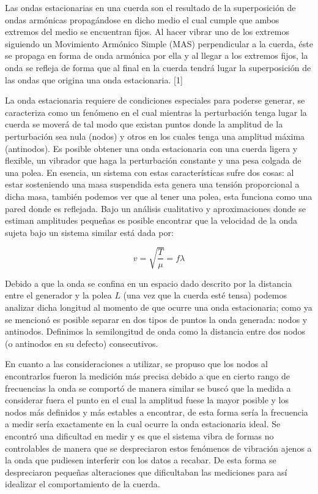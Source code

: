 \documentclass[10pt,a4paper]{article}
\begin{document}
Las ondas estacionarias en una cuerda son el resultado de la superposición de ondas armónicas propagándose en dicho medio el cual cumple que ambos extremos del medio se encuentran fijos. Al hacer vibrar uno de los extremos siguiendo un Movimiento Armónico Simple (MAS) perpendicular a la cuerda, éste se propaga en forma de onda armónica por ella y al llegar a los extremos fijos, la onda se refleja de forma que al final en la cuerda tendrá lugar la superposición de las ondas que origina una onda estacionaria. [1] 

La onda estacionaria requiere de condiciones especiales para poderse generar, se caracteriza como un fenómeno en el cual mientras la perturbación tenga lugar la cuerda se moverá de tal modo que existan puntos donde la amplitud de la perturbación sea nula (nodos) y otros en los cuales tenga una amplitud máxima (antinodos). Es posible obtener una onda estacionaria con una cuerda ligera y flexible, un vibrador que haga la perturbación constante y una pesa colgada de una polea. En esencia, un sistema con estas características sufre dos cosas: al estar sosteniendo una masa suspendida esta genera una tensión proporcional a dicha masa, también podemos ver que al tener una polea, esta funciona como una pared donde es reflejada. Bajo un análisis cualitativo y aproximaciones donde se estiman amplitudes pequeñas es posible encontrar que la velocidad de la onda sujeta bajo un sistema similar está dada por:

\begin{equation}
v=\sqrt{\frac{T}{\mu}}= f \lambda
\end{equation}

Debido a que la onda se confina en un espacio dado descrito por la distancia entre el generador y la polea $L$ (una vez que la cuerda esté tensa) podemos analizar dicha longitud al momento de que ocurre una onda estacionaria; como ya se mencionó es posible separar en dos tipos de puntos la onda generada: nodos y antinodos. Definimos la semilongitud de onda como la distancia entre dos nodos (o antinodos en su defecto) consecutivos.

En cuanto a las consideraciones a utilizar, se propuso que los nodos al encontrarlos fueron la medición más precisa debido a que en cierto rango de frecuencias la onda se comportó de manera similar se buscó que la medida a considerar fuera el punto en el cual la amplitud fuese la mayor posible y los nodos más definidos y más estables a encontrar, de esta forma sería la frecuencia a medir sería exactamente en la cual ocurre la onda estacionaria ideal. Se encontró una dificultad en medir y es que el sistema vibra de formas no controlables de manera que se despreciaron estos fenómenos de vibración ajenos a la onda que pudiesen interferir con los datos a recabar. De esta forma se despreciaron pequeñas alteraciones que dificultaban las mediciones para así idealizar el comportamiento de la cuerda. 
\end{document}
